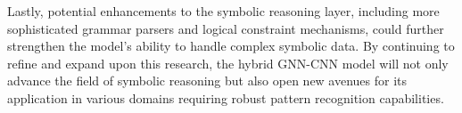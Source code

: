\documentclass{article}
\begin{document}
Lastly, potential enhancements to the symbolic reasoning layer, including more sophisticated grammar parsers and logical constraint mechanisms, could further strengthen the model's ability to handle complex symbolic data. By continuing to refine and expand upon this research, the hybrid GNN-CNN model will not only advance the field of symbolic reasoning but also open new avenues for its application in various domains requiring robust pattern recognition capabilities.



\end{document}
